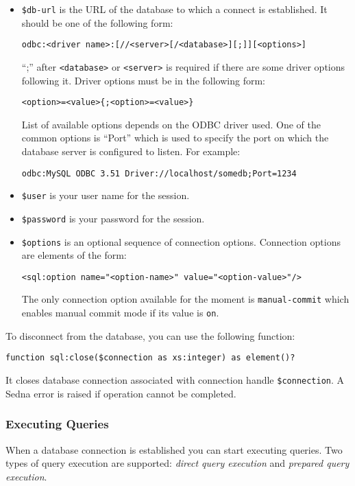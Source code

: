 \documentclass[a4paper,12pt]{article}
\begin{document}
\begin{itemize}
\item\verb!$db-url! is the URL of the database to which a connect is
established. It should be one of the following form:
\small{\begin{verbatim}
odbc:<driver name>:[//<server>[/<database>][;]][<options>]
\end{verbatim}}
``;'' after \verb!<database>! or \verb!<server>! is required if there are some
driver options following it. Driver options must be in the following form:
\begin{verbatim}
<option>=<value>{;<option>=<value>}
\end{verbatim}
List of available options depends on the ODBC driver used. One of the common
options is ``Port'' which is used to specify the port on which the database
server is configured to listen. For example:
\small{\begin{verbatim}
odbc:MySQL ODBC 3.51 Driver://localhost/somedb;Port=1234
\end{verbatim}}
\item\verb!$user! is your user name for the session.
\item\verb!$password! is your password for the session.
\item\verb!$options! is an optional sequence of connection options. Connection
options are elements of the form:
\begin{verbatim}
<sql:option name="<option-name>" value="<option-value>"/>
\end{verbatim}
The only connection option available for the moment is \verb!manual-commit!
which enables manual commit mode if its value is \verb!on!.
\end{itemize}

To disconnect from the database, you can use the following function:
\begin{verbatim}
function sql:close($connection as xs:integer) as element()?
\end{verbatim}
It closes database connection associated with connection handle
\verb!$connection!. A Sedna error is raised if operation cannot be completed.


\subsubsection*{Executing Queries}
When a database connection is established you can start executing queries. Two
types of query execution are supported: \emph{direct query execution} and
\emph{prepared query execution}.
\end{document}
